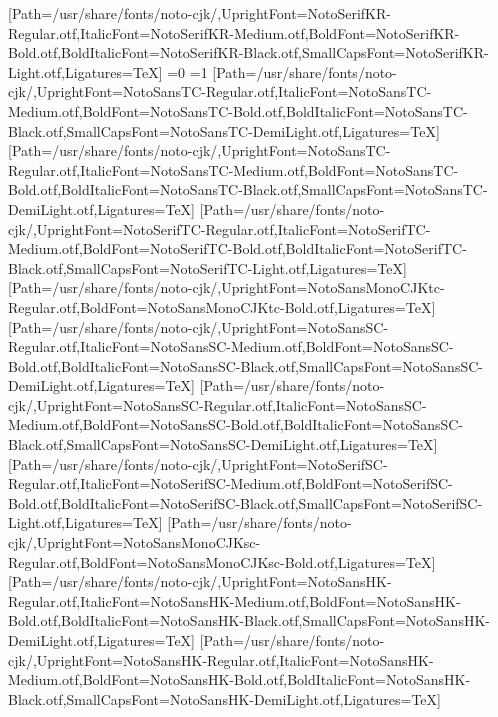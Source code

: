 [Path=/usr/share/fonts/noto-cjk/,UprightFont=NotoSerifKR-Regular.otf,ItalicFont=NotoSerifKR-Medium.otf,BoldFont=NotoSerifKR-Bold.otf,BoldItalicFont=NotoSerifKR-Black.otf,SmallCapsFont=NotoSerifKR-Light.otf,Ligatures=TeX]
\fi\fi\fi\fi\fi\fi\fi\fi\fi\fi\fi\fi\fi\fi
\ifnum\value{NotoCJKFamily}=0
\else\ifnum\value{NotoCJKFamily}=1
\newfontfamily{}[Path=/usr/share/fonts/noto-cjk/,UprightFont=NotoSansTC-Regular.otf,ItalicFont=NotoSansTC-Medium.otf,BoldFont=NotoSansTC-Bold.otf,BoldItalicFont=NotoSansTC-Black.otf,SmallCapsFont=NotoSansTC-DemiLight.otf,Ligatures=TeX]
\newfontfamily{}[Path=/usr/share/fonts/noto-cjk/,UprightFont=NotoSansTC-Regular.otf,ItalicFont=NotoSansTC-Medium.otf,BoldFont=NotoSansTC-Bold.otf,BoldItalicFont=NotoSansTC-Black.otf,SmallCapsFont=NotoSansTC-DemiLight.otf,Ligatures=TeX]
\newfontfamily{}[Path=/usr/share/fonts/noto-cjk/,UprightFont=NotoSerifTC-Regular.otf,ItalicFont=NotoSerifTC-Medium.otf,BoldFont=NotoSerifTC-Bold.otf,BoldItalicFont=NotoSerifTC-Black.otf,SmallCapsFont=NotoSerifTC-Light.otf,Ligatures=TeX]
\newfontfamily{}[Path=/usr/share/fonts/noto-cjk/,UprightFont=NotoSansMonoCJKtc-Regular.otf,BoldFont=NotoSansMonoCJKtc-Bold.otf,Ligatures=TeX]
\newfontfamily{}[Path=/usr/share/fonts/noto-cjk/,UprightFont=NotoSansSC-Regular.otf,ItalicFont=NotoSansSC-Medium.otf,BoldFont=NotoSansSC-Bold.otf,BoldItalicFont=NotoSansSC-Black.otf,SmallCapsFont=NotoSansSC-DemiLight.otf,Ligatures=TeX]
\newfontfamily{}[Path=/usr/share/fonts/noto-cjk/,UprightFont=NotoSansSC-Regular.otf,ItalicFont=NotoSansSC-Medium.otf,BoldFont=NotoSansSC-Bold.otf,BoldItalicFont=NotoSansSC-Black.otf,SmallCapsFont=NotoSansSC-DemiLight.otf,Ligatures=TeX]
\newfontfamily{}[Path=/usr/share/fonts/noto-cjk/,UprightFont=NotoSerifSC-Regular.otf,ItalicFont=NotoSerifSC-Medium.otf,BoldFont=NotoSerifSC-Bold.otf,BoldItalicFont=NotoSerifSC-Black.otf,SmallCapsFont=NotoSerifSC-Light.otf,Ligatures=TeX]
\newfontfamily{}[Path=/usr/share/fonts/noto-cjk/,UprightFont=NotoSansMonoCJKsc-Regular.otf,BoldFont=NotoSansMonoCJKsc-Bold.otf,Ligatures=TeX]
\newfontfamily{}[Path=/usr/share/fonts/noto-cjk/,UprightFont=NotoSansHK-Regular.otf,ItalicFont=NotoSansHK-Medium.otf,BoldFont=NotoSansHK-Bold.otf,BoldItalicFont=NotoSansHK-Black.otf,SmallCapsFont=NotoSansHK-DemiLight.otf,Ligatures=TeX]
\newfontfamily{}[Path=/usr/share/fonts/noto-cjk/,UprightFont=NotoSansHK-Regular.otf,ItalicFont=NotoSansHK-Medium.otf,BoldFont=NotoSansHK-Bold.otf,BoldItalicFont=NotoSansHK-Black.otf,SmallCapsFont=NotoSansHK-DemiLight.otf,Ligatures=TeX]
